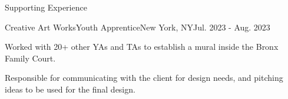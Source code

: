 \documentclass[]{kyvernitis-resume}
\begin{document}
\begin{section}{Supporting Experience}
    \begin{subsection}{Creative Art Works}{Youth Apprentice}{New York, NY}{Jul. 2023 - Aug. 2023}
        \item Worked with 20+ other YAs and TAs to establish a mural inside the Bronx Family Court.
        \item Responsible for communicating with the client for design needs, and pitching ideas to be used for the final design.
    \end{subsection}
\end{section}
\end{document}
